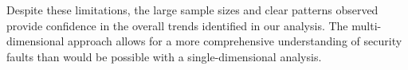 Despite these limitations, the large sample sizes and clear patterns observed provide confidence in the overall trends identified in our analysis. The multi-dimensional approach allows for a more comprehensive understanding of security faults than would be possible with a single-dimensional analysis.

